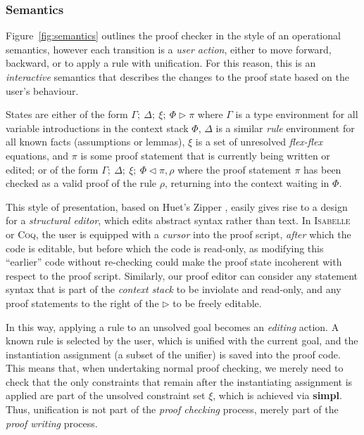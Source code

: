 \documentclass[a4paper]{jfp}
\begin{document}
\subsubsection{Semantics}

Figure~\ref{fig:semantics} outlines the proof checker in the style of an operational semantics,
however each transition is a \emph{user action}, either to move forward, backward, or to apply
a rule with unification. For this reason, this is an \emph{interactive} semantics that describes
the changes to the proof state based on the user's behaviour.

States are either of the form $\Gamma;\ \Delta;\ \xi;\ \Phi \triangleright \pi$ where
$\Gamma$ is a type environment for all variable introductions in the context stack $\Phi$,
$\Delta$ is a similar \emph{rule} environment for all known facts (assumptions or lemmas), $\xi$
is a set of unresolved \emph{flex-flex} equations, and $\pi$ is some proof statement that is
currently being written or edited; or of the form $\Gamma;\ \Delta;\ \xi;\ \Phi \triangleleft \pi, \rho$
where the proof statement $\pi$ has been checked as a valid proof of the rule $\rho$, returning
into the context waiting in $\Phi$.

This style of presentation, based on Huet's Zipper \cite{citeulike:352553}, easily
gives rise to a design for a \emph{structural editor}, which edits abstract syntax rather than text.
In \textsc{Isabelle} or \textsc{Coq}, the user is equipped with a \emph{cursor} into the proof script, \emph{after}
which the code is editable, but before which the code is read-only, as modifying this ``earlier'' 
code without  re-checking could make the proof state incoherent with respect to the proof script. 
Similarly, our proof editor can consider any statement syntax that is part of the 
\emph{context stack} to be inviolate and read-only, and any proof statements to the right of the 
$\triangleright$ to be freely editable.

In this way, applying a rule to an unsolved goal becomes an \emph{editing} action. A known rule is
selected by the user, which is unified with the current goal, and the instantiation assignment (a subset of the unifier) is saved into the proof code.  This means that, when undertaking normal proof checking, we merely need to check that the only constraints that remain after the instantiating assignment is applied are part of the unsolved constraint set $\xi$, which is achieved via \textbf{simpl}. Thus, unification is not part of the \emph{proof checking} process, merely part of the \emph{proof writing} process.
\end{document}
